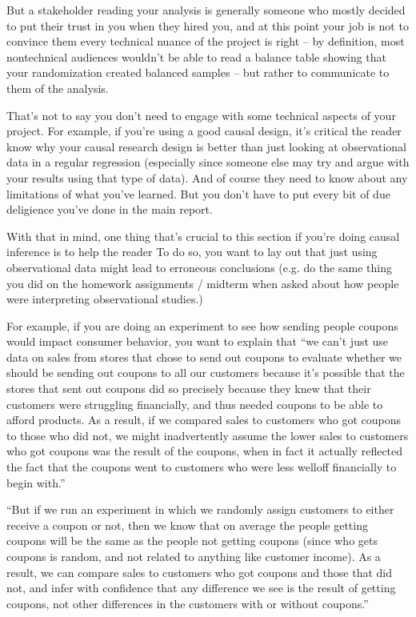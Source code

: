 \documentclass[letterpaper,10pt,english]{jupyterBook}
\begin{document}
\sphinxAtStartPar
But a stakeholder reading your analysis is generally someone who mostly decided to put their trust in you when they hired you, and at this point your job is not to convince them every technical nuance of the project is right – by definition, most non\sphinxhyphen{}technical audiences wouldn’t be able to read a balance table showing that your randomization created balanced samples – but rather to communicate to them  of the analysis.

\sphinxAtStartPar
That’s not to say you don’t need to engage with some technical aspects of your project. For example, if you’re using a good causal design, it’s critical the reader know why your causal research design is better than just looking at observational data in a regular regression (especially since someone else may try and argue with your results using that type of data). And of course they need to know about any limitations of what you’ve learned. But you don’t have to put every bit of due deligience you’ve done in the main report.

\sphinxAtStartPar
With that in mind, one thing that’s crucial to this section if you’re doing causal inference is to help the reader  To do so, you want to lay out  that just using observational data might lead to erroneous conclusions (e.g. do the same thing you did on the homework assignments / midterm when asked about how people were interpreting observational studies.)

\sphinxAtStartPar
For example, if you are doing an experiment to see how sending people coupons would impact consumer behavior, you want to explain that “we can’t just use data on sales from stores that chose to send out coupons to evaluate whether we should be sending out coupons to all our customers because it’s possible that the stores that sent out coupons did so precisely because they knew that their customers were struggling financially, and thus needed coupons to be able to afford products. As a result, if we compared sales to customers who got coupons to those who did not, we might inadvertently assume the lower sales to customers who got coupons was the result of the coupons, when in fact it actually reflected the fact that the coupons went to customers who were less well\sphinxhyphen{}off financially to begin with.”

\sphinxAtStartPar
“But if we run an experiment in which we randomly assign customers to either receive a coupon or not, then we know that on average the people getting coupons will be the same as the people not getting coupons (since who gets coupons is random, and not related to anything like customer income). As a result, we can compare sales to customers who got coupons and those that did not, and infer with confidence that any difference we see is the result of getting coupons, not other differences in the customers with or without coupons.”
\end{document}
